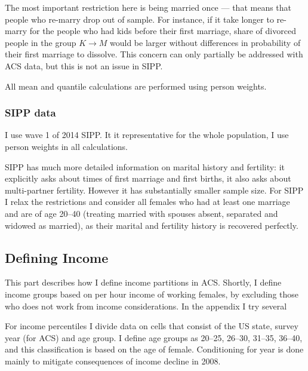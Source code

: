 \documentclass[12pt,letter]{article}
\begin{document}
The most important restriction here is being married once --- that means that people who re-marry drop out of sample. For instance, if it take longer to re-marry for the people who had kids before their first marriage, share of divorced people in the group $K\to M$ would be larger without differences in probability of their first marriage to dissolve. This concern can only partially be addressed with ACS data, but this is not an issue in SIPP. 


All mean and quantile calculations are performed using person weights.

\subsubsection{SIPP data}

I use wave 1 of 2014 SIPP. It it representative for the whole population, I use person weights in all calculations.

SIPP has much more detailed information on marital history and fertility: it explicitly asks about times of first marriage and first births, it also asks about multi-partner fertility. However it has substantially smaller sample size. For SIPP I relax the restrictions and consider all females who had at least one marriage and are of age 20--40 (treating married with spouses absent, separated and widowed as married), as their marital and fertility history is recovered perfectly.


\subsection{Defining Income}
This part describes how I define income partitions in ACS. Shortly, I define income groups based on per hour income of working females, by excluding those who does not work from income considerations. In the appendix I try several 

For income percentiles I divide data on cells that consist of the US state, survey year (for ACS) and age group. I define age groups as 20--25, 26--30, 31--35, 36--40, and this classification is based on the age of female. Conditioning for year is done mainly to mitigate consequences of income decline in 2008. 
\end{document}
